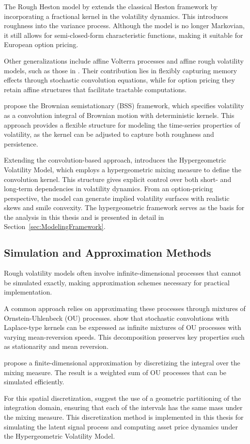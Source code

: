 The Rough Heston model by \citet{ElEuchRosenbaum2019} extends the classical Heston framework by incorporating a fractional kernel in the volatility dynamics. This introduces roughness into the variance process. Although the model is no longer Markovian, it still allows for semi-closed-form characteristic functions, making it suitable for European option pricing.

Other generalizations include affine Volterra processes and affine rough volatility models, such as those in \citet{AbiJaberLarssonPulido2019}. Their contribution lies in flexibly capturing memory effects through stochastic convolution equations, while for option pricing they retain affine structures that facilitate tractable computations.

\citet{BennedsenLundePakkanen2021} propose the Brownian semistationary (BSS) framework, which specifies volatility as a convolution integral of Brownian motion with deterministic kernels. This approach provides a flexible structure for modeling the time-series properties of volatility, as the kernel can be adjusted to capture both roughness and persistence.

Extending the convolution-based approach, \citet{Damian2021} introduces the Hypergeometric Volatility Model, which employs a hypergeometric mixing measure to define the convolution kernel. This structure gives explicit control over both short- and long-term dependencies in volatility dynamics. From an option-pricing perspective, the model can generate implied volatility surfaces with realistic skews and smile convexity. The hypergeometric framework serves as the basis for the analysis in this thesis and is presented in detail in Section~\ref{sec:ModelingFramework}.


\subsection{Simulation and Approximation Methods} \label{subsec:SimulationApproximation}

Rough volatility models often involve infinite-dimensional processes that cannot be simulated exactly, making approximation schemes necessary for practical implementation.

A common approach relies on approximating these processes through mixtures of Ornstein-Uhlenbeck (OU) processes. \citet{CarmonaCoutin1998} show that stochastic convolutions with Laplace-type kernels can be expressed as infinite mixtures of OU processes with varying mean-reversion speeds. This decomposition preserves key properties such as stationarity and mean reversion.

\citet{CarmonaCoutinMontseny2000} propose a finite-dimensional approximation by discretizing the integral over the mixing measure. The result is a weighted sum of OU processes that can be simulated efficiently.

For this spatial discretization, \citet{DamianFrey2024} suggest the use of a geometric partitioning of the integration domain, ensuring that each of the intervals has the same mass under the mixing measure. This discretization method is implemented in this thesis for simulating the latent signal process and computing asset price dynamics under the Hypergeometric Volatility Model.